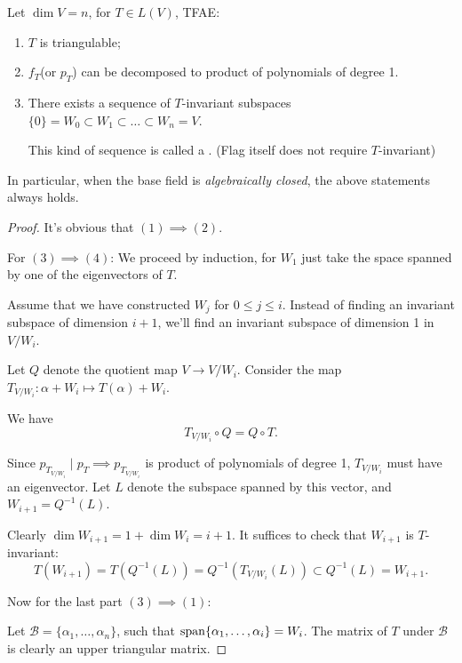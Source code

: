 \begin{proposition}
	Let $\dim V=n$, for  $T\in L(V)$, TFAE:
	\begin{enumerate}
		\item $T$ is triangulable;
		\item $f_T$(or $p_T$) can be decomposed to product of polynomials of degree 1.
		\item There exists a sequence of $T$-invariant subspaces
			$\{0\}=W_0 \subset W_1 \subset\dots \subset W_n = V$.

			This kind of sequence is called a .
			(Flag itself does not require $T$-invariant)
	\end{enumerate}
\end{proposition}
\begin{remark}
	In particular, when the base field is \textit{algebraically closed}, the above
	statements always holds.
\end{remark}
\begin{proof}[Proof]
	It's obvious that $(1) \implies (2)$.

	For $(3)\implies (4)$:
	We proceed by induction, for $W_1$ just take the space spanned by
	one of the eigenvectors of $T$.

	Assume that we have constructed $W_j$ for $0\le j\le i$.
	Instead of finding an invariant subspace of dimension $i+1$,
	we'll find an invariant subspace of dimension 1 in  $V / W_i$.


	Let $Q$ denote the quotient map  $V\to V / W_i$.
	Consider the map $T_{V / W_i}: \alpha+W_i \mapsto T(\alpha)+W_i$.

	We have
	\[
		T_{V / W_i}\circ Q = Q\circ T.
	\]

	Since $p_{T_{V / W_i}}\mid p_T \implies p_{T_{V /W_i}}$ is product of
	polynomials of degree 1, $T_{V / W_i}$ must have an eigenvector.
	Let $L$ denote the subspace spanned by this vector,
	and $W_{i+1}=Q^{-1}(L)$.

	Clearly $\dim W_{i+1} = 1 + \dim W_i = i+1$.
	It suffices to check that  $W_{i+1}$ is $T$-invariant:
	\[
	T(W_{i+1}) = T(Q^{-1}(L)) = Q^{-1}(T_{V / W_i}(L)) \subset Q^{-1}(L) = W_{i+1}.
	\]

	Now for the last part $(3)\implies (1)$:

	Let $\mathcal{B} = \{\alpha_1,\dots,\alpha_n\}$,
	such that $\operatorname{span}\{\alpha_1,\dots,\alpha_i\} = W_i$.
	The matrix of $T$ under  $\mathcal{B}$ is clearly an upper triangular matrix.
\end{proof}
